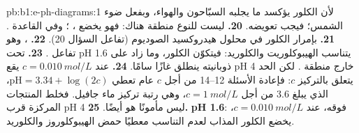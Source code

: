 \begin{solution}{pb:b1:e-ph-diagrams:1}
لأن الكلور يؤكسد ما يجلبه السبّاحون والهواء، وبفعل
ضوء الشمس؛ فيجب تعويضه.
\textbf{20.} ليست للنوع  منطقة هناك: فهو يخضع ،
؛ وفي القاعدة
.
\textbf{21.} بإمرار الكلور في محلول هيدروكسيد الصوديوم (تفاعل
السؤال 20).
\textbf{22.} ، وهو تفاعل .
\textbf{23.} تحت pH 1.6 يتناسب الهيبوكلوريت والكلوريد: فيتكوّن الكلور،
وما زاد على ذوبانيته ينطلق غازًا سامًا.
\textbf{24.} عند $c = \qty{0.010}{mol/L}$ يقع pH 4 خارج منطقة
. لكن الحد يتعلق بالتركيز $c$: فإعادة الأسئلة 12--14 من أجل
$c$ عام تعطي $\mathrm{pH} = 3.34 + \log(2c)$، الذي يبلغ 3.6 من أجل
$c = \qty{1}{mol/L}$، وهي رتبة تركيز ماء جافيل. فخلط
المنتجات المركزة قرب pH 4 ليس مأمونًا هو أيضًا.
\textbf{25.} \textbf{pH 1.6}: فوقه، عند $c = \qty{0.010}{mol/L}$،
يخضع الكلور المذاب لعدم التناسب معطيًا حمض الهيبوكلوروز والكلوريد.
\end{solution}
